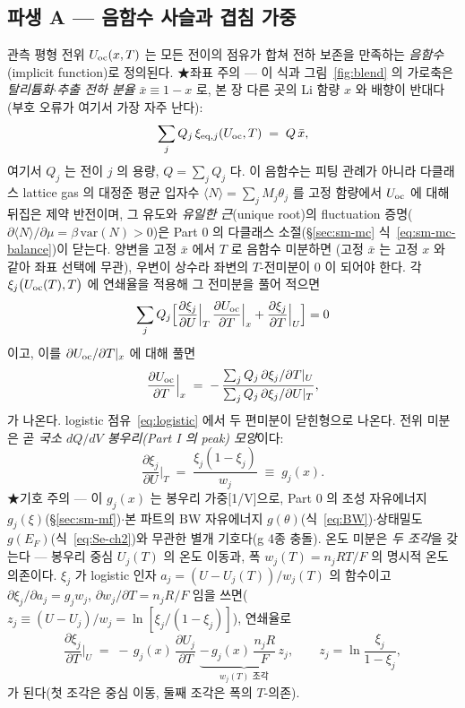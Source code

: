 \subsection{파생 A --- 음함수 사슬과 겹침 가중}\label{ssec:overlap}
관측 평형 전위 $U_{\mathrm{oc}}(x,T)$ 는 모든 전이의 점유가 합쳐 전하 보존을 만족하는 \emph{음함수}(implicit function)로 정의된다. ★좌표 주의
--- 이 식과 그림~\ref{fig:blend} 의 가로축은 \emph{탈리튬화$\cdot$추출 전하 분율} $\bar x\equiv1-x$ 로, 본 장
다른 곳의 Li 함량 $x$ 와 배향이 반대다(부호 오류가 여기서 가장 자주 난다):
\begin{equation}
\sum_j Q_j\,\xi_{\mathrm{eq},j}(U_{\mathrm{oc}},T) \;=\; Q\,\bar x,
\label{eq:implicit}
\end{equation}
여기서 $Q_j$ 는 전이 $j$ 의 용량, $Q=\sum_j Q_j$ 다. 이 음함수는 피팅 관례가 아니라 다클래스 lattice gas 의
대정준 평균 입자수 $\langle N\rangle=\sum_jM_j\theta_j$ 를 고정 함량에서 $U_{\mathrm{oc}}$ 에 대해 뒤집은 제약
반전이며, 그 유도와 \emph{유일한 근}(unique root)의 fluctuation 증명($\partial\langle N\rangle/\partial\mu=\beta\,\mathrm{var}(N)>0$)은
Part 0 의 다클래스 소절(\S\ref{sec:sm-mc} 식~\eqref{eq:sm-mc-balance})이 닫는다. 양변을 고정 $\bar x$ 에서 $T$ 로 음함수 미분하면
(고정 $\bar x$ 는 고정 $x$ 와 같아 좌표 선택에 무관), 우변이 상수라 좌변의 $T$-전미분이 $0$ 이 되어야
한다. 각 $\xi_j\bigl(U_{\mathrm{oc}}(T),T\bigr)$ 에 연쇄율을 적용해 그 전미분을 풀어 적으면
\[
\sum_j Q_j\Big[\frac{\partial\xi_j}{\partial U}\Big|_T\,\frac{\partial U_{\mathrm{oc}}}{\partial T}\Big|_x
+\frac{\partial\xi_j}{\partial T}\Big|_U\Big]=0
\]
이고, 이를 $\partial U_{\mathrm{oc}}/\partial T|_x$ 에 대해 풀면
\begin{equation}
\frac{\partial U_{\mathrm{oc}}}{\partial T}\Big|_x
\;=\; -\,\frac{\sum_j Q_j\,\partial\xi_j/\partial T|_U}{\sum_j Q_j\,\partial\xi_j/\partial U|_T},
\label{eq:implicit_diff}
\end{equation}
가 나온다. logistic 점유~\eqref{eq:logistic} 에서 두 편미분이 닫힌형으로 나온다. 전위 미분은 곧 \emph{국소
$dQ/dV$ 봉우리(Part I 의 peak) 모양}이다:
\begin{equation}
\frac{\partial\xi_j}{\partial U}\Big|_T \;=\; \frac{\xi_j(1-\xi_j)}{w_j} \;\equiv\; g_j(x).
\label{eq:gj}
\end{equation}
★기호 주의 --- 이 $g_j(x)$ 는 봉우리 가중[1/V]으로, Part 0 의 조성 자유에너지 $g_j(\xi)$(\S\ref{sec:sm-mf})$\cdot$본 파트의
BW 자유에너지 $g(\theta)$(식~\eqref{eq:BW})$\cdot$상태밀도 $g(E_F)$(식~\eqref{eq:Se-ch2})와 무관한 별개
기호다(g 4종 충돌). 온도 미분은 \emph{두 조각}을 갖는다 --- 봉우리 중심 $U_j(T)$ 의 온도 이동과,
폭 $w_j(T)=n_jRT/F$ 의 명시적 온도 의존이다. $\xi_j$ 가 logistic 인자 $a_j=(U-U_j(T))/w_j(T)$ 의 함수이고
$\partial\xi_j/\partial a_j=g_j w_j$, $\partial w_j/\partial T=n_jR/F$ 임을 쓰면($z_j\equiv(U-U_j)/w_j=\ln[\xi_j/
(1-\xi_j)]$), 연쇄율로
\begin{equation}
\frac{\partial\xi_j}{\partial T}\Big|_U
\;=\; -\,g_j(x)\,\frac{\partial U_j}{\partial T}
\;\underbrace{-\,g_j(x)\,\frac{n_jR}{F}\,z_j}_{w_j(T)\text{ 조각}},
\qquad z_j=\ln\frac{\xi_j}{1-\xi_j},
\label{eq:dxidT}
\end{equation}
가 된다(첫 조각은 중심 이동, 둘째 조각은 폭의 $T$-의존).

